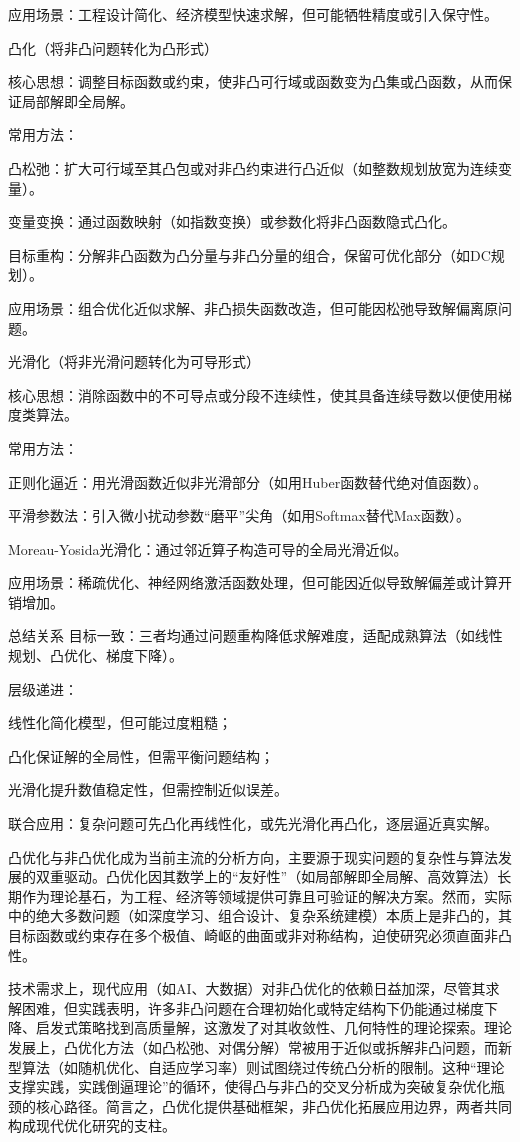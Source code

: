 \documentclass{article}
\begin{document}
	应用场景：工程设计简化、经济模型快速求解，但可能牺牲精度或引入保守性。
	
	凸化（将非凸问题转化为凸形式）
	
	核心思想：调整目标函数或约束，使非凸可行域或函数变为凸集或凸函数，从而保证局部解即全局解。
	
	常用方法：
	
	凸松弛：扩大可行域至其凸包或对非凸约束进行凸近似（如整数规划放宽为连续变量）。
	
	变量变换：通过函数映射（如指数变换）或参数化将非凸函数隐式凸化。
	
	目标重构：分解非凸函数为凸分量与非凸分量的组合，保留可优化部分（如DC规划）。
	
	应用场景：组合优化近似求解、非凸损失函数改造，但可能因松弛导致解偏离原问题。
	
	光滑化（将非光滑问题转化为可导形式）
	
	核心思想：消除函数中的不可导点或分段不连续性，使其具备连续导数以便使用梯度类算法。
	
	常用方法：
	
	正则化逼近：用光滑函数近似非光滑部分（如用Huber函数替代绝对值函数）。
	
	平滑参数法：引入微小扰动参数“磨平”尖角（如用Softmax替代Max函数）。
	
	Moreau-Yosida光滑化：通过邻近算子构造可导的全局光滑近似。
	
	应用场景：稀疏优化、神经网络激活函数处理，但可能因近似导致解偏差或计算开销增加。
	
	总结关系
	目标一致：三者均通过问题重构降低求解难度，适配成熟算法（如线性规划、凸优化、梯度下降）。
	
	层级递进：
	
	线性化简化模型，但可能过度粗糙；
	
	凸化保证解的全局性，但需平衡问题结构；
	
	光滑化提升数值稳定性，但需控制近似误差。
	
	联合应用：复杂问题可先凸化再线性化，或先光滑化再凸化，逐层逼近真实解。
	
	凸优化与非凸优化成为当前主流的分析方向，主要源于现实问题的复杂性与算法发展的双重驱动。凸优化因其数学上的“友好性”（如局部解即全局解、高效算法）长期作为理论基石，为工程、经济等领域提供可靠且可验证的解决方案。然而，实际中的绝大多数问题（如深度学习、组合设计、复杂系统建模）本质上是非凸的，其目标函数或约束存在多个极值、崎岖的曲面或非对称结构，迫使研究必须直面非凸性。
	
	技术需求上，现代应用（如AI、大数据）对非凸优化的依赖日益加深，尽管其求解困难，但实践表明，许多非凸问题在合理初始化或特定结构下仍能通过梯度下降、启发式策略找到高质量解，这激发了对其收敛性、几何特性的理论探索。理论发展上，凸优化方法（如凸松弛、对偶分解）常被用于近似或拆解非凸问题，而新型算法（如随机优化、自适应学习率）则试图绕过传统凸分析的限制。这种“理论支撑实践，实践倒逼理论”的循环，使得凸与非凸的交叉分析成为突破复杂优化瓶颈的核心路径。简言之，凸优化提供基础框架，非凸优化拓展应用边界，两者共同构成现代优化研究的支柱。
	
\end{document}

